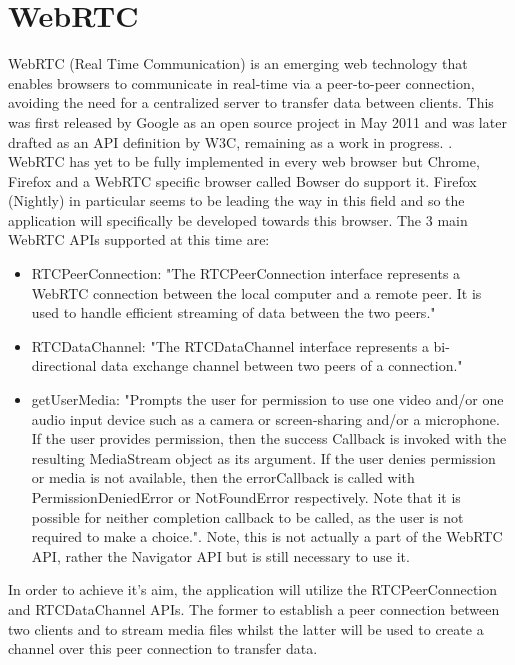 \documentclass[]{report}
\begin{document}
\section{WebRTC}			
	WebRTC (Real Time Communication) is an emerging web technology that enables browsers to communicate in real-time via a peer-to-peer connection, avoiding the need for a centralized server to transfer data between clients. This was first released by Google as an open source project in May 2011 \cite{Google WebRTC Release} and was later drafted as an API definition by W3C, remaining as a work in progress. \cite{W3C WebRTC Definition}. WebRTC has yet to be fully implemented in every web browser but Chrome, Firefox and a WebRTC specific browser called Bowser do support it. Firefox (Nightly) in particular seems to be leading the way in this field and so the application will specifically be developed towards this browser\cite{WebRTC browser support}.
	The 3 main WebRTC APIs supported at this time are:
		\begin{itemize}
			\item RTCPeerConnection:
			"The RTCPeerConnection interface represents a WebRTC connection between the local computer and a remote peer. It is used to handle efficient streaming of data between the two peers." \cite{Mozilla Web API}
			\item RTCDataChannel:
			"The RTCDataChannel interface represents a bi-directional data exchange channel between two peers of a connection." \cite{Mozilla Web API}
			\item getUserMedia:
			"Prompts the user for permission to use one video and/or one audio input device such as a camera or screen-sharing and/or a microphone. If the user provides permission, then the success Callback is invoked with the resulting MediaStream object as its argument. If the user denies permission or media is not available, then the errorCallback is called with PermissionDeniedError or NotFoundError respectively. Note that it is possible for neither completion callback to be called, as the user is not required to make a choice."\cite{Mozilla Web API}. Note, this is not actually a part of the WebRTC API, rather the Navigator API but is still necessary to use it.
		\end{itemize}
		
	In order to achieve it's aim, the application will utilize the RTCPeerConnection and RTCDataChannel APIs. The former to establish a peer connection between two clients and to stream media files whilst the latter will be used to create a channel over this peer connection to transfer data.
			
\end{document}
